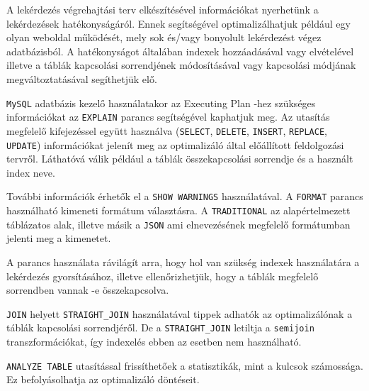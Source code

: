 

A lekérdezés végrehajtási terv elkészítésével információkat nyerhetünk a lekérdezések hatékonyságáról. Ennek segítségével optimalizálhatjuk például egy olyan weboldal működését, mely sok és/vagy bonyolult lekérdezést végez adatbázisból. A hatékonyságot általában indexek hozzáadásával vagy elvételével illetve a táblák kapcsolási sorrendjének módosításával vagy kapcsolási módjának megváltoztatásával segíthetjük elő.


\texttt{MySQL} adatbázis kezelő használatakor az Executing Plan -hez szükséges információkat az \texttt{EXPLAIN} parancs segítségével kaphatjuk meg.
Az utasítás megfelelő kifejezéssel együtt használva (\texttt{SELECT}, \texttt{DELETE}, \texttt{INSERT}, \texttt{REPLACE}, \texttt{UPDATE})  információkat jelenít meg az optimalizáló által előállított feldolgozási tervről. Láthatóvá válik például a táblák összekapcsolási sorrendje és a használt index neve.

További információk érhetők el a \texttt{SHOW WARNINGS} használatával.
A \texttt{FORMAT} parancs használható kimeneti formátum választásra. A \texttt{TRADITIONAL} az alapértelmezett táblázatos alak, illetve másik a \texttt{JSON} ami elnevezésének megfelelő formátumban jelenti meg a kimenetet.

A parancs használata rávilágít arra, hogy hol van szükség indexek használatára a lekérdezés gyorsításához, illetve ellenőrizhetjük, hogy a táblák megfelelő sorrendben vannak -e összekapcsolva. 

\texttt{JOIN} helyett \texttt{STRAIGHT\_JOIN} használatával tippek adhatók az optimalizálónak a táblák kapcsolási sorrendjéről. De a \texttt{STRAIGHT\_JOIN} letiltja a \texttt{semijoin} transzformációkat, így indexelés ebben az esetben nem használható.

\texttt{ANALYZE TABLE} utasítással frissíthetőek a statisztikák, mint a kulcsok számossága. Ez befolyásolhatja az optimalizáló döntéseit. \cite{explain}


